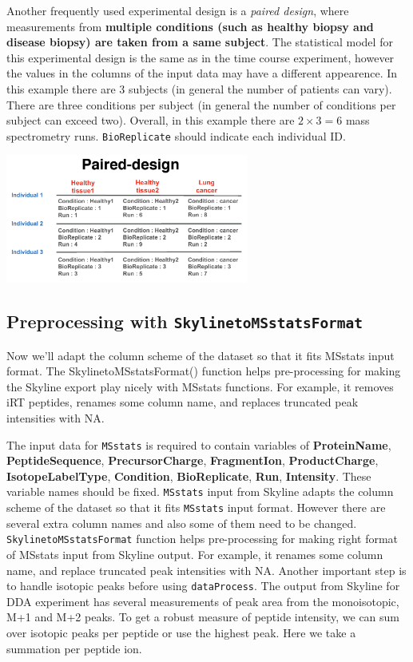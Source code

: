 \documentclass[]{book}
\begin{document}
Another frequently used experimental design is a \emph{paired design}, where measurements from \textbf{multiple conditions (such as healthy biopsy and disease biopsy) are taken from a same subject}. The statistical model for this experimental design is the same as in the time course experiment, however the values in the columns of the input data may have a different appearence. In this example there are 3 subjects (in general the number of patients can vary). There are three conditions per subject (in general the number of conditions per subject can exceed two). Overall, in this example there are \(2 \times 3 = 6\) mass spectrometry runs. \texttt{BioReplicate} should indicate each individual ID.

\includegraphics[width=0.6\textwidth,height=\textheight]{img/expdesign_pair.png}

\hypertarget{preprocessing-with-skylinetomsstatsformat}{%
\subsection{\texorpdfstring{Preprocessing with \texttt{SkylinetoMSstatsFormat}}{Preprocessing with SkylinetoMSstatsFormat}}\label{preprocessing-with-skylinetomsstatsformat}}

Now we'll adapt the column scheme of the dataset so that it fits MSstats input format. The SkylinetoMSstatsFormat() function helps pre-processing for making the Skyline export play nicely with MSstats functions. For example, it removes iRT peptides, renames some column name, and replaces truncated peak intensities with NA.

The input data for \texttt{MSstats} is required to contain variables of \textbf{ProteinName}, \textbf{PeptideSequence}, \textbf{PrecursorCharge}, \textbf{FragmentIon}, \textbf{ProductCharge}, \textbf{IsotopeLabelType}, \textbf{Condition}, \textbf{BioReplicate}, \textbf{Run}, \textbf{Intensity}. These variable names should be fixed. \texttt{MSstats} input from Skyline adapts the column scheme of the dataset so that it fits \texttt{MSstats} input format. However there are several extra column names and also some of them need to be changed. \texttt{SkylinetoMSstatsFormat} function helps pre-processing for making right format of MSstats input from Skyline output. For example, it renames some column name, and replace truncated peak intensities with NA. Another important step is to handle isotopic peaks before using \texttt{dataProcess}. The output from Skyline for DDA experiment has several measurements of peak area from the monoisotopic, M+1 and M+2 peaks. To get a robust measure of peptide intensity, we can sum over isotopic peaks per peptide or use the highest peak. Here we take a summation per peptide ion.
\end{document}
